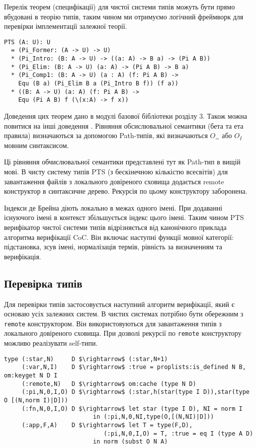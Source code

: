 Перелік теорем (специфікації) для чистої системи типів можуть бути
прямо вбудовані в теорію типів, таким чином ми отримуємо логічний фреймворк
для перевірки імплементації залежної теорії.

\begin{lstlisting}[mathescape=true]
PTS (A: U): U
  = (Pi_Former: (A -> U) -> U)
  * (Pi_Intro: (B: A -> U) -> ((a: A) -> B a) -> (Pi A B))
  * (Pi_Elim: (B: A -> U) (a: A) -> (Pi A B) -> B a)
  * (Pi_Comp1: (B: A -> U) (a : A) (f: Pi A B) ->
    Equ (B a) (Pi_Elim B a (Pi_Intro B f)) (f a))
  * ((B: A -> U) (a: A) (f: Pi A B) ->
    Equ (Pi A B) f (\(x:A) -> f x))
\end{lstlisting}

Доведення цих теорем дано в модулі базової бібліотеки розділу 3.
Також можна повитися на інші доведення \cite{Henk93}.
Рівняння обсислювальної семантики (бета та ета правила) визначаються
за допомогою Path-типів, які визначаються $O_=$ або $O_I$ мовним синтаксисом.

Ці рівняння обчислювальної семантики представлені тут як Path-тип в вищій мові.
В чисту систему типів PTS (з бескінечною кількістю всесвітів)
для завантаження файлів з локального довіреного сховища додається
remote конструктор в синтаксичне дерево. Рекурсія по цьому конструктору заборонена.

Індекси де Брейна діють локально в межах одного імені.
При додаванні існуючого імені в контекст збільшується індекс цього імені.
Таким чином PTS верифікатор чистої системи типів відрізняється від
канонічного приклада алгоритма верифікації CoC\cite{Coq88}. Він включає
наступні функції мовної категорії: підстановка,
зсув імені, нормалізація термів, рівність
за визначенням та верифікація.

\subsection*{Перевірка типів}

Для перевірки типів застосовується наступний алгоритм верифікації, який є основаю
усіх залежних систем. В чистих системах потрібно бути обережним з \lstinline{remote}
конструктором. Він використовуються для завантаження типів з локального довіреного сховища.
При дозволі рекурсії по \lstinline{remote} конструктору можливо реалізувати
self-типи\cite{Stump17}\cite{Fu14}.

\begin{lstlisting}[mathescape=true]
type (:star,N)     D $\rightarrow$ (:star,N+1)
     (:var,N,I)    D $\rightarrow$ :true = proplists:is_defined N B, om:keyget N D I
     (:remote,N)   D $\rightarrow$ om:cache (type N D)
     (:pi,N,0,I,O) D $\rightarrow$ (:star,h(star(type I D)),star(type O [(N,norm I)|D]))
     (:fn,N,0,I,O) D $\rightarrow$ let star (type I D), NI = norm I
                         in (:pi,N,0,NI,type(O,[(N,NI)|D]))
     (:app,F,A)    D $\rightarrow$ let T = type(F,D),
                            (:pi,N,0,I,O) = T, :true = eq I (type A D)
                         in norm (subst O N A)
\end{lstlisting}

